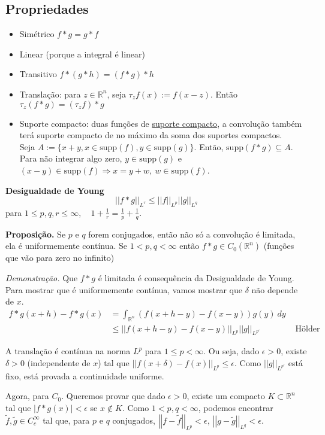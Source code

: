 \documentclass[11pt]{article}
\newcommand{\Rn}{{\mathbb{R}^n}}
\newcommand{\e}{\epsilon}
\newcommand{\norm}[2]{\left|\left|#1\right|\right|_{L^{#2}}}
\begin{document}
\subsection{Propriedades}
\begin{itemize}
	\item Simétrico \( f*g = g*f \)
	\item Linear (porque a integral é linear)
	\item Transitivo \( f * (g * h) = (f* g) *h \)
	\item Translação: para \(z \in \Rn\), seja \(\tau_z f(x) := f(x-z)\). Então
	\(\tau_z (f * g) = (\tau_z f) * g \)
	\item Suporte compacto: duas funções de \href{https://en.wikipedia.org/wiki/Support_(mathematics)#Compact_support}{suporte compacto}, a convolução também terá suporte compacto de no máximo da soma dos suportes compactos.\\ Seja \( A := \{ x+y, x \in \text{supp}(f), y \in \text{supp}(g) \} \). Então, \( \text{supp}(f*g) \subseteq A \). Para não integrar algo zero, \( y \in \text{supp}(g) \) e \( (x-y) \in \text{supp}(f) \Rightarrow x=y+w,\ w \in \text{supp}(f)\).
\end{itemize}	
	\textbf{Desigualdade de Young} \[\norm{f*g}{r} \leq \norm{f}{p} \norm{g}{q} \] para \(1 \leq p,q,r \leq \infty, \quad 1 + \frac{1}{r} = \frac{1}{p} + \frac{1}{q}\).


\textbf{Proposição.} Se \(p\) e \(q\) forem conjugados, então não só a convolução é limitada, ela é uniformemente contínua. Se \(1 < p,q < \infty\) então \(f * g \in C_0 (\Rn)\) (funções que vão para zero no infinito)

\textit{Demonstração.} Que \(f*g\) é limitada é consequência da Desigualdade de Young. Para mostrar que é uniformemente contínua, vamos mostrar que \(\delta\) não depende de \(x\).
\begin{align*}
	f*g(x+h) - f*g(x) &= \int_{\Rn} \left( f(x+h-y) - f(x-y) \right) g(y) \ dy &\\
	&\leq \norm{f(x+h-y) - f(x-y)}{p} \norm{g}{p'} &\text{ Hölder}
\end{align*}

A translação é contínua na norma \(L^p\) para \(1 \leq p < \infty\). Ou seja, dado \(\e>0\), existe \(\delta > 0 \) (independente de \(x\)) tal que \(\norm{f(x+\delta) - f(x)}{p} \leq \e \).
Como \(\norm{g}{p'}\) está fixo, está provada a continuidade uniforme.

Agora, para \(C_0\). Queremos provar que dado \(\e>0\), existe um compacto \(K \subset \Rn\) tal que \(\left| f * g(x) \right| < \e\) se \(x \notin K\). Como \(1 < p,q < \infty\), podemos encontrar \(\tilde{f}, \tilde{g} \in C^\infty_c\) tal que, para \(p\) e \(q\) conjugados, \(\norm{f - \tilde{f}}{p} < \e\), \hspace{2mm} \(\norm{g - \tilde{g}}{q} < \e\).
\end{document}
